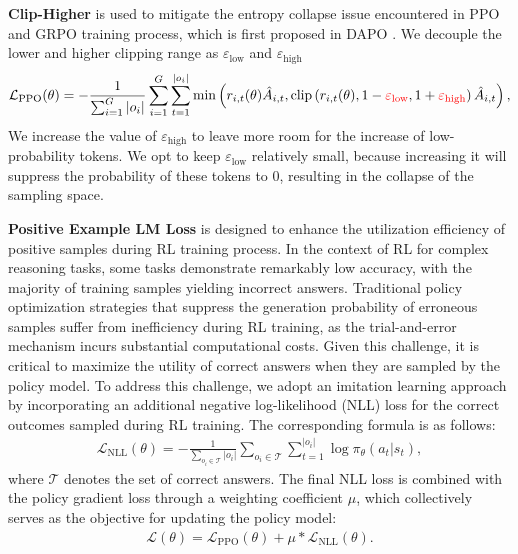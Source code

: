 \textbf{Clip-Higher} is used to mitigate the entropy collapse issue encountered in PPO and GRPO training process, which is first proposed in DAPO \citep{dapo}. We decouple the lower and higher clipping range as $\varepsilon_\text{low}$ and $\varepsilon_\text{high}$
\begin{align}
\mathcal{L}_{\text{PPO}}(\theta) =- \frac{1}{\sum_{i = 1}^G |o_i|} \sum_{i = 1}^G \sum_{t = 1}^{|o_i|} \min \left(r_{i,t}(\theta) \hat{A}_{i,t}, \text{clip}\left(r_{i,t}(\theta), 1-\textcolor{red}{\varepsilon_\text{low}}, 1 + \textcolor{red}{\varepsilon_\text{high}}\right) \hat{A}_{i,t}\right),
\end{align}
We increase the value of $\varepsilon_\text{high}$ to leave more room for the increase of low-probability tokens. We opt to keep $\varepsilon_\text{low}$ relatively small, because increasing it will suppress the probability of these tokens to 0, resulting in the collapse of the sampling space.

\textbf{Positive Example LM Loss} is designed to enhance the utilization efficiency of positive samples during RL training process. In the context of RL for complex reasoning tasks, some tasks demonstrate remarkably low accuracy, with the majority of training samples yielding incorrect answers. Traditional policy optimization strategies that suppress the generation probability of erroneous samples suffer from inefficiency during RL training, as the trial-and-error mechanism incurs substantial computational costs. Given this challenge, it is critical to maximize the utility of correct answers when they are sampled by the policy model. To address this challenge, we adopt an imitation learning approach by incorporating an additional negative log-likelihood (NLL) loss for the correct outcomes sampled during RL training. The corresponding formula is as follows:
\begin{align}
\mathcal{L}_{\text{NLL}}(\theta) =- \frac{1}{\sum_{o_i \in \mathcal{T}}|o_i|} \sum_{o_i \in \mathcal{T}} \sum_{t = 1}^{|o_i|} \log\pi_{\theta}\left(a_t|s_t\right),
\end{align}
where $\mathcal{T}$ denotes the set of correct answers. The final NLL loss is combined with the policy gradient loss through a weighting coefficient $\mu$, which collectively serves as the objective for updating the policy model:
\begin{align}
\mathcal{L}(\theta) = \mathcal{L}_{\text{PPO}}(\theta) + \mu * \mathcal{L}_{\text{NLL}}(\theta).
\end{align}

